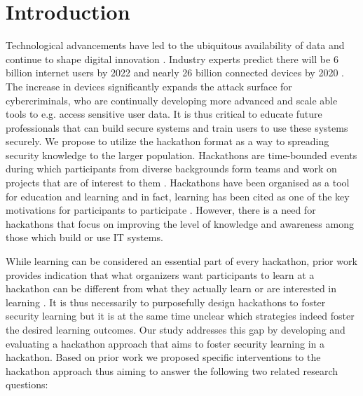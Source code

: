 \documentclass[runningheads]{llncs}
\begin{document}
\section{Introduction}
Technological advancements have led to the ubiquitous availability of data and continue to shape digital innovation \cite{davenport2013analytics}. 
Industry experts predict there will be 6 billion internet users by 2022 \cite{cybersecventures2019} and nearly 26 billion connected devices by 2020 \cite{hung2017gartner}. The increase in devices significantly expands the attack surface for cybercriminals, who are continually developing more advanced and scale able tools to e.g. access sensitive user data. 
It is thus critical to educate future professionals that can build secure systems and train users to use these systems securely.
We propose to utilize the hackathon format as a way to spreading security knowledge to the larger population. Hackathons are time-bounded events during which participants from diverse backgrounds form teams and work on projects that are of interest to them \cite{pe2018designing}. Hackathons have been organised as a tool for education and learning \cite{porras2019code,kienzler2017learning} and in fact, learning has been cited as one of the key motivations for participants to participate \cite{juell2014public}. However, there is a need for hackathons that focus on improving the level of knowledge and awareness among those which build or use IT systems.

While learning can be considered an essential part of every hackathon, prior work provides indication that what organizers want participants to learn at a hackathon can be different from what they actually learn or are interested in learning \cite{medina2019does}. It is thus necessarily to purposefully design hackathons to foster security learning but it is at the same time unclear which strategies indeed foster the desired learning outcomes. Our study addresses this gap by developing and evaluating a hackathon approach that aims to foster security learning in a hackathon. Based on prior work we proposed specific interventions to the hackathon approach thus aiming to answer the following two related research questions:
\end{document}
